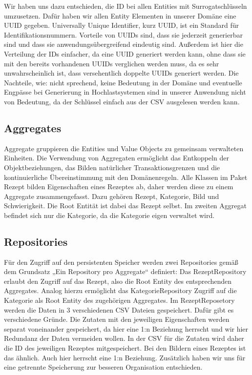 Wir haben uns dazu entschieden, die ID bei allen Entities mit Surrogatschlüsseln umzusetzen. Dafür haben wir allen Entity Elementen in unserer Domäne eine UUID gegeben. Universally Unique Identifier, kurz UUID, ist ein Standard für Identifikationsnummern. Vorteile von UUIDs sind, dass sie jederzeit generierbar sind und dass sie anwendungsübergreifend eindeutig sind. Außerdem ist hier die Verteilung der IDs einfacher, da eine UUID generiert werden kann, ohne dass sie mit den bereits vorhandenen UUIDs verglichen werden muss, da es sehr unwahrscheinlich ist, dass versehentlich doppelte UUIDs generiert werden. Die Nachteile, wie: nicht sprechend, keine Bedeutung in der Domäne und eventuelle Engpässe bei Generierung in
Hochlastsystemen sind in unserer Anwendung nicht von Bedeutung, da der Schlüssel einfach aus der CSV ausgelesen werden kann.

\subsection{Aggregates}
Aggregate gruppieren die Entities und Value Objects zu gemeinsam verwalteten Einheiten. Die Verwendung von Aggregaten ermöglicht das Entkoppeln der Objektbeziehungen, das Bilden natürlicher Transaktionsgrenzen und die kontinuierliche Übereinstimmung mit den Domänenregeln.
Alle Klassen im Paket Rezept bilden Eigenschaften eines Rezeptes ab, daher werden diese zu einem Aggregate zusammengefasst. Dazu gehören Rezept, Kategorie, Bild und Schwierigkeit. Die Root Entität ist dabei das Rezept selbst. Im zweiten Aggregat befindet sich nur die Kategorie, da die Kategorie eigen verwaltet wird.

\subsection{Repositories}
Für den Zugriff auf den persistenten Speicher werden zwei Repositories gemäß dem Grundsatz „Ein Repository pro Aggregate“ definiert: Das RezeptRepository erlaubt den Zugriff auf das Rezept, also die Root Entity des entsprechenden Aggregates. Analog hierzu ermöglicht das KategorieRepository Zugriff auf die Kategorie als Root Entity des zugehörigen Aggregates. Im RezeptReposetory werden die Daten in 3 verschiedenen CSV Dateien gespeichert. Dafür gibt es verschiedene Gründe. Die Zutaten mit den jeweiligen Eigenschaften werden separat voneinander gespeichert, da hier eine 1:n Beziehung herrscht und wir hier Redundanz der Daten vermeiden wollen. In der CSV für die Zutaten wird daher die ID des jeweiligen Rezeptes mitgespeichert. Bei den Bildern eines Rezeptes ist das ähnlich. Auch hier herrscht eine 1:n Beziehung. Zusätzlich haben wir uns für eine getrennte Speicherung zur besseren Organisation entschieden.
